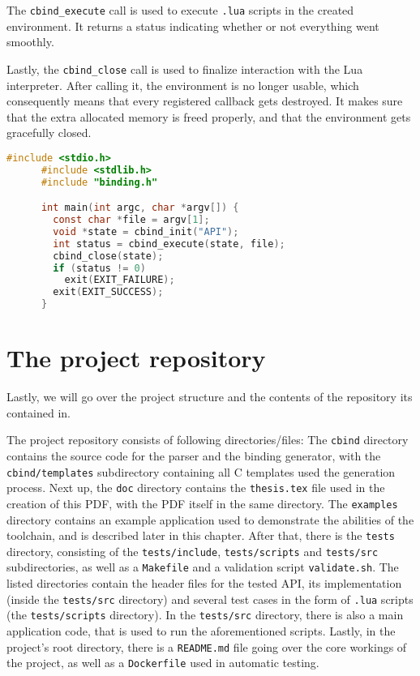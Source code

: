 \documentclass[polish, english]{iithesis}
\begin{document}
    The \texttt{cbind\_execute} call is used to execute \texttt{.lua} scripts in the created environment.
    It returns a status indicating whether or not everything went smoothly.

    Lastly, the \texttt{cbind\_close} call is used to finalize interaction with the Lua interpreter.
    After calling it, the environment is no longer usable, which consequently means that every registered callback gets destroyed.
    It makes sure that the extra allocated memory is freed properly, and that the environment gets gracefully closed.

    \begin{lstlisting}[caption=Example interaction with the interface, language=c]
      #include <stdio.h>
      #include <stdlib.h>
      #include "binding.h"

      int main(int argc, char *argv[]) {
        const char *file = argv[1];
        void *state = cbind_init("API");
        int status = cbind_execute(state, file);
        cbind_close(state);
        if (status != 0)
          exit(EXIT_FAILURE);
        exit(EXIT_SUCCESS);
      }
    \end{lstlisting}

\chapter{The project repository}
  Lastly, we will go over the project structure and the contents of the repository its contained in.

  The project repository consists of following directories/files:
  The \texttt{cbind} directory contains the source code for the parser and the binding generator, with the \texttt{cbind/templates} subdirectory containing all C templates used the generation process.
  Next up, the \texttt{doc} directory contains the \texttt{thesis.tex} file used in the creation of this PDF, with the PDF itself in the same directory.
  The \texttt{examples} directory contains an example application used to demonstrate the abilities of the toolchain, and is described later in this chapter.
  After that, there is the \texttt{tests} directory, consisting of the \texttt{tests/include}, \texttt{tests/scripts} and \texttt{tests/src} subdirectories, as well as a \texttt{Makefile} and a validation script \texttt{validate.sh}.
  The listed directories contain the header files for the tested API, its implementation (inside the \texttt{tests/src} directory) and several test cases in the form of \texttt{.lua} scripts (the \texttt{tests/scripts} directory).
  In the \texttt{tests/src} directory, there is also a main application code, that is used to run the aforementioned scripts.
  Lastly, in the project's root directory, there is a \texttt{README.md} file going over the core workings of the project, as well as a \texttt{Dockerfile} used in automatic testing.
\end{document}
